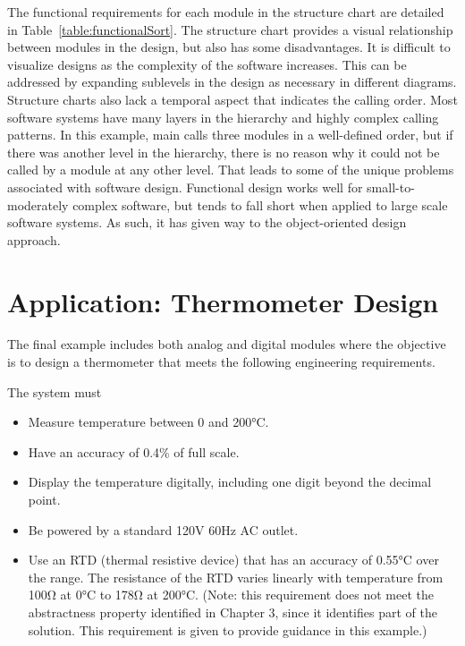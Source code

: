 The functional requirements for each module in the structure chart are
detailed in Table~\ref{table:functionalSort}. 
The structure chart provides a visual
relationship between modules in the design, but also has some
disadvantages. It is difficult to visualize designs as the complexity of
the software increases. This can be addressed by expanding sublevels in
the design as necessary in different diagrams. Structure charts also
lack a temporal aspect that indicates the calling order. Most software
systems have many layers in the hierarchy and highly complex calling
patterns. In this example, main calls three modules in a well-defined
order, but if there was another level in the hierarchy, there is no
reason why it could not be called by a module at any other level. That
leads to some of the unique problems associated with software design.
Functional design works well for small-to-moderately complex software,
but tends to fall short when applied to large scale software systems. As
such, it has given way to the object-oriented design approach.

\section{Application: Thermometer Design}
\label{section:application-thermometer-design}

The final example includes both analog and digital modules where the
objective is to design a thermometer that meets the following
engineering requirements.

The system must

\begin{itemize}
\item
  Measure temperature between 0 and 200°C.
\item
  Have an accuracy of 0.4\% of full scale.
\item
  Display the temperature digitally, including one digit beyond the
  decimal point.
\item
  Be powered by a standard 120V 60Hz AC outlet.
\item
  Use an RTD (thermal resistive device) that has an accuracy of 0.55°C
  over the range. The resistance of the RTD varies linearly with
  temperature from 100Ω at 0°C to 178Ω at 200°C. (Note: this requirement
  does not meet the abstractness property identified in Chapter 3, since
  it identifies part of the solution. This requirement is given to
  provide guidance in this example.)
\end{itemize}



